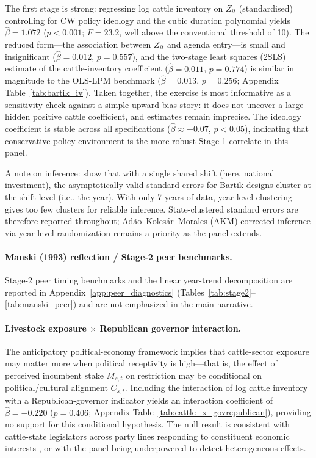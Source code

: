 \documentclass[12pt]{article}
\begin{document}
The first stage is strong: regressing log cattle inventory on $Z_{it}$ (standardised) controlling for CW policy ideology and the cubic duration polynomial yields $\hat{\beta} = 1.072$ ($p < 0.001$; $F = 23.2$, well above the conventional threshold of 10).  The reduced form---the association between $Z_{it}$ and agenda entry---is small and insignificant ($\hat{\beta} = 0.012$, $p = 0.557$), and the two-stage least squares (2SLS) estimate of the cattle-inventory coefficient ($\hat{\beta} = 0.011$, $p = 0.774$) is similar in magnitude to the OLS-LPM benchmark ($\hat{\beta} = 0.013$, $p = 0.256$; Appendix Table~\ref{tab:bartik_iv}).  Taken together, the exercise is most informative as a sensitivity check against a simple upward-bias story: it does not uncover a large hidden positive cattle coefficient, and estimates remain imprecise.  The ideology coefficient is stable across all specifications ($\hat{\beta} \approx -0.07$, $p < 0.05$), indicating that conservative policy environment is the more robust Stage-1 correlate in this panel.

A note on inference: \citet{adao2019shift} show that with a single shared shift (here, national investment), the asymptotically valid standard errors for Bartik designs cluster at the shift level (i.e., the year).  With only 7 years of data, year-level clustering gives too few clusters for reliable inference.  State-clustered standard errors are therefore reported throughout; Ad\~ao--Koles\'ar--Morales (AKM)-corrected inference via year-level randomization remains a priority as the panel extends.

\paragraph{Manski (1993) reflection / Stage-2 peer benchmarks.}
Stage-2 peer timing benchmarks and the linear year-trend decomposition are reported in Appendix~\ref{app:peer_diagnostics} (Tables~\ref{tab:stage2}--\ref{tab:manski_peer}) and are not emphasized in the main narrative.

\paragraph{Livestock exposure $\times$ Republican governor interaction.}  The anticipatory political-economy framework implies that cattle-sector exposure may matter more when political receptivity is high---that is, the effect of perceived incumbent stake $M_{s,t}$ on restriction may be conditional on political/cultural alignment $C_{s,t}$.  Including the interaction of log cattle inventory with a Republican-governor indicator yields an interaction coefficient of $\hat{\beta} = -0.220$ ($p = 0.406$; Appendix Table~\ref{tab:cattle_x_govrepublican}), providing no support for this conditional hypothesis.  The null result is consistent with cattle-state legislators across party lines responding to constituent economic interests \citep{peltzman1976toward}, or with the panel being underpowered to detect heterogeneous effects.
\end{document}
